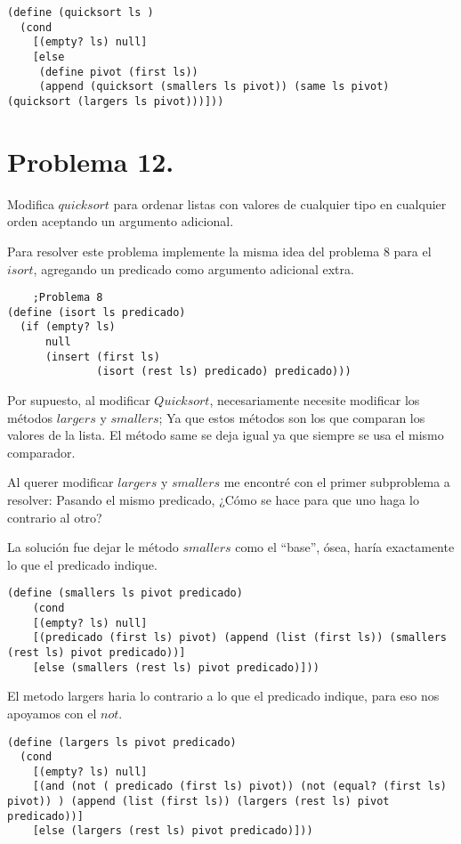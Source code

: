 \documentclass{article}
\begin{document}
\begin{lstlisting}
(define (quicksort ls )
  (cond
    [(empty? ls) null]
    [else
     (define pivot (first ls))
     (append (quicksort (smallers ls pivot)) (same ls pivot) (quicksort (largers ls pivot)))]))
\end{lstlisting}

\section*{Problema 12.}
Modifica $quicksort$ para ordenar listas con valores de cualquier tipo en cualquier
orden aceptando un argumento adicional.


Para resolver este problema implemente la misma idea del problema 8 para el $isort$, agregando un predicado como argumento adicional extra.

\begin{lstlisting}
    ;Problema 8
(define (isort ls predicado)
  (if (empty? ls)
      null
      (insert (first ls)
              (isort (rest ls) predicado) predicado)))
\end{lstlisting}

Por supuesto, al modificar $Quicksort$, necesariamente necesite modificar los métodos $largers$ y $smallers$; Ya que estos métodos son los que comparan los valores de la lista. El método same se deja igual ya que siempre se usa el mismo comparador.

Al querer modificar $largers$ y $smallers$ me encontré con el primer subproblema a resolver: Pasando el mismo predicado, ¿Cómo se hace para que uno haga lo contrario al otro?

La solución fue dejar le método $smallers$ como el “base”, ósea, haría exactamente lo que el predicado indique.

\begin{lstlisting}
(define (smallers ls pivot predicado)
    (cond
    [(empty? ls) null]
    [(predicado (first ls) pivot) (append (list (first ls)) (smallers (rest ls) pivot predicado))]
    [else (smallers (rest ls) pivot predicado)]))
\end{lstlisting}

El metodo largers haria lo contrario a lo que el predicado indique, para eso nos apoyamos con el $not$.

\begin{lstlisting}
(define (largers ls pivot predicado)
  (cond
    [(empty? ls) null]
    [(and (not ( predicado (first ls) pivot)) (not (equal? (first ls) pivot)) ) (append (list (first ls)) (largers (rest ls) pivot predicado))]
    [else (largers (rest ls) pivot predicado)]))
\end{lstlisting}
\end{document}

